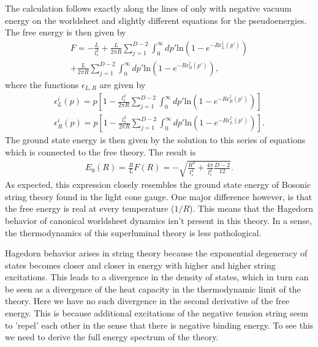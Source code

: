 \documentclass[%
 reprint,
 amsmath,amssymb,
 aps,
]{revtex4-1}
\begin{document}
The calculation follows exactly along the lines of \cite{Dubovsky:2012wk} only with negative vacuum energy
on the worldsheet and slightly different equations for the pseudoenergies. The free energy is then given by
\begin{eqnarray}
    F = - \frac{L}{l_s^2} + \frac{L}{2 \pi R} \sum_{j=1}^{D-2} \int_0^{\infty} d p'
    \mathrm{ln}\left(1 - e^{-R \epsilon_L^j (p')} \right) \nonumber \\
    + \frac{L}{2 \pi R} \sum_{j=1}^{D-2} \int_0^{\infty} d p'
    \mathrm{ln}\left(1 - e^{-R \epsilon_R^j (p')} \right) \nonumber ,
\end{eqnarray}
where the functions $\epsilon_{L,R}$ are given by
\begin{eqnarray}
    \epsilon_L^i (p) = p \left[ 1 - \frac{l_s^2}{2 \pi R} \sum_{j=1}^{D-2} \int_0^{\infty}
    d p' \mathrm{ln} \left(1 - e^{-R \epsilon_R^j (p')}\right) \right] \nonumber \\
    \epsilon_R^i (p) = p \left[ 1 - \frac{l_s^2}{2 \pi R} \sum_{j=1}^{D-2} \int_0^{\infty}
    d p' \mathrm{ln} \left(1 - e^{-R \epsilon_L^j (p')}\right) \right] \nonumber .
\end{eqnarray}
The ground state energy is then given by the solution to this series of equations which is connected
to the free theory.  The result is
\begin{eqnarray}
    E_0(R) = \frac{R}{L} F(R) = -\sqrt{\frac{R^2}{l_s^4} + \frac{4 \pi}{l_s^2} \frac{D-2}{12}}
    \nonumber .
\end{eqnarray}
As expected, this expression closely resembles the ground state energy of Bosonic string theory
found in the light cone gauge. One major difference however, is that the free energy is real at
every temperature ($1/R$).  This means that the Hagedorn behavior of canonical worldsheet dynamics
isn't present in this theory.  In a sense, the thermodynamics of this superluminal theory is less
pathological.

Hagedorn behavior arises in string theory because the exponential degeneracy of states becomes
closer and closer in energy with higher and higher string excitations. This leads to a divergence in
the density of states, which in turn can be seen as a divergence of the heat capacity in the
thermodynamic limit of the theory.  Here we have no such divergence in the second derivative of the
free energy.  This is because additional excitations of the negative tension string seem to 'repel'
each other in the sense that there is negative binding energy. To see this we need to derive the
full energy spectrum of the theory.
\end{document}
